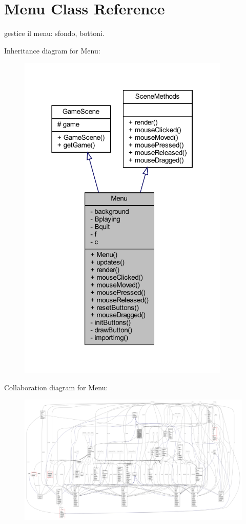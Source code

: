 \hypertarget{classscenes_1_1_menu}{}\section{Menu Class Reference}
\label{classscenes_1_1_menu}


gestice il menu\+: sfondo, bottoni.  




Inheritance diagram for Menu\+:\nopagebreak
\begin{figure}[H]
\begin{center}
\leavevmode
\includegraphics[width=286pt]{classscenes_1_1_menu__inherit__graph}
\end{center}
\end{figure}


Collaboration diagram for Menu\+:
\nopagebreak
\begin{figure}[H]
\begin{center}
\leavevmode
\includegraphics[width=350pt]{classscenes_1_1_menu__coll__graph}
\end{center}
\end{figure}
